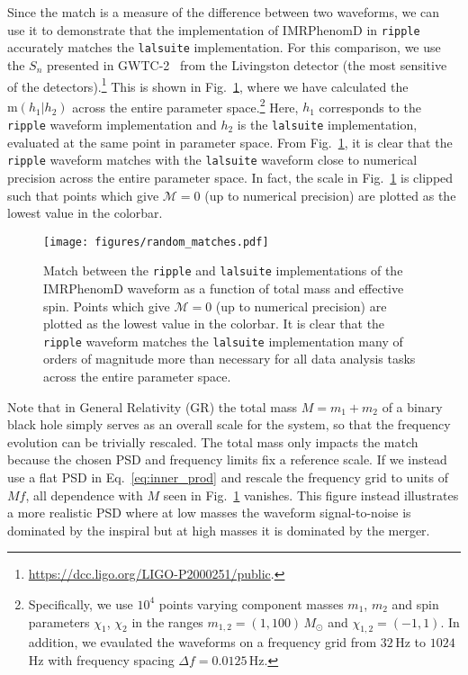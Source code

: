 \documentclass[twocolumn]{aastex631}
\newcommand{\ripple}{\texttt{ripple}\xspace}
\newcommand{\lalsuite}{\texttt{lalsuite}\xspace}
\begin{document}
Since the match is a measure of the difference between two waveforms, we can use it to demonstrate that the implementation of IMRPhenomD in \ripple accurately matches the \lalsuite implementation. For this comparison, we use the $S_n$  presented in GWTC-2~\citep{LIGOScientific:2020ibl} from the Livingston detector (the most sensitive of the detectors).\footnote{
    \url{https://dcc.ligo.org/LIGO-P2000251/public}.
    }
This is shown in Fig.~\ref{fig:match}, where we have calculated the $\mathrm{m}(h_1|h_2)$ across the entire parameter space.\footnote{
    Specifically, we use $10^4$ points varying component masses $m_1$, $m_2$ and spin parameters $\chi_1$, $\chi_2$ in the ranges $m_{1,2} = (1,100)\,M_{\odot}$ and $\chi_{1,2} = (-1,1)$. In addition, we evaulated the waveforms on a frequency grid from $32\,$Hz to $1024\,$Hz with frequency spacing $\Delta f = 0.0125 \,$Hz.
}
Here, $h_1$ corresponds to the \ripple waveform implementation and $h_2$ is the \lalsuite implementation, evaluated at the same point in parameter space.
From Fig.~\ref{fig:match}, it is clear that the \ripple waveform matches with the \lalsuite waveform close to numerical precision across the entire parameter space.
In fact, the scale in Fig.~\ref{fig:match} is clipped such that points which give $\mathcal{M}=0$ (up to numerical precision) are plotted as the lowest value in the colorbar.

\begin{figure}[t]
    \begin{centering}
        \texttt{[image: figures/random\_matches.pdf]}
        \caption{
            Match between the \ripple and \lalsuite implementations of the IMRPhenomD waveform as a function of total mass and effective spin. 
            Points which give $\mathcal{M}=0$ (up to numerical precision) are plotted as the lowest value in the colorbar.
            It is clear that the \ripple waveform matches the \lalsuite implementation many of orders of magnitude more than necessary for all data analysis tasks across the entire parameter space.
        }
        \label{fig:match}
    \end{centering}
\end{figure}

Note that in General Relativity (GR) the total mass $M = m_1 + m_2$ of a binary black hole simply serves as an overall scale for the system, so that the frequency evolution can be trivially rescaled.
The total mass only impacts the match because the chosen PSD and frequency limits fix a reference scale.
If we instead use a flat PSD in Eq.~\eqref{eq:inner_prod} and rescale the frequency grid to units of $Mf$, all dependence with $M$ seen in Fig.~\ref{fig:match} vanishes. 
This figure instead illustrates a more realistic PSD where at low masses the waveform signal-to-noise is dominated by the inspiral but at high masses it is dominated by the merger.
\end{document}
